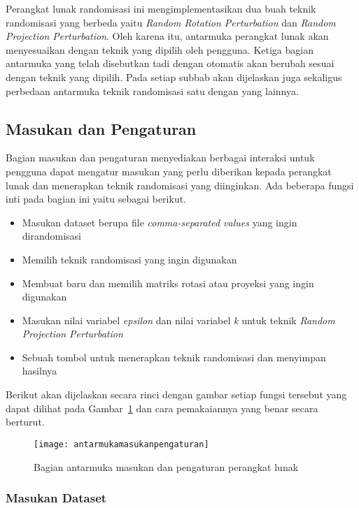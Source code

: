 Perangkat lunak randomisasi ini mengimplementasikan dua buah teknik randomisasi yang berbeda yaitu \textit{Random Rotation Perturbation} dan \textit{Random Projection Perturbation}. Oleh karena itu, antarmuka perangkat lunak akan menyesuaikan dengan teknik yang dipilih oleh pengguna. Ketiga bagian antarmuka yang telah disebutkan tadi dengan otomatis akan berubah sesuai dengan teknik yang dipilih. Pada setiap subbab akan dijelaskan juga sekaligus perbedaan antarmuka teknik randomisasi satu dengan yang lainnya.

\subsection{Masukan dan Pengaturan}
\label{subsec:masukanpengaturan}

Bagian masukan dan pengaturan menyediakan berbagai interaksi untuk pengguna dapat mengatur masukan yang perlu diberikan kepada perangkat lunak dan menerapkan teknik randomisasi yang diinginkan. Ada beberapa fungsi inti pada bagian ini yaitu sebagai berikut.
\begin{itemize}
	\item Masukan dataset berupa file \textit{comma-separated values} yang ingin dirandomisasi
	\item Memilih teknik randomisasi yang ingin digunakan
	\item Membuat baru dan memilih matriks rotasi atau proyeksi yang ingin digunakan
	\item Masukan nilai variabel \textit{epsilon} dan nilai variabel \textit{k} untuk teknik \textit{Random Projection Perturbation}
	\item Sebuah tombol untuk menerapkan teknik randomisasi dan menyimpan hasilnya
\end{itemize}
Berikut akan dijelaskan secara rinci dengan gambar setiap fungsi tersebut yang dapat dilihat pada Gambar~\ref{fig:antarmukamasukanpengaturan} dan cara pemakaiannya yang benar secara berturut. 

\begin{figure}
	\centering
	\texttt{[image: antarmukamasukanpengaturan]}
	\caption{Bagian antarmuka masukan dan pengaturan perangkat lunak}
	\label{fig:antarmukamasukanpengaturan}
\end{figure}

\subsubsection{Masukan Dataset}
\label{subsubsec:masukandataset}

